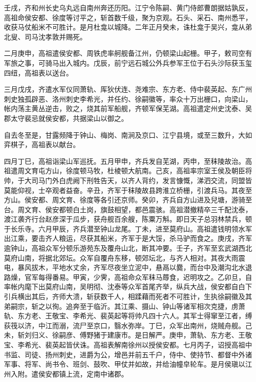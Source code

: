 \documentclass[]{article}
\begin{document}
壬戌，齐和州长史乌丸远自南州奔还历阳。江宁令陈嗣、黄门侍郎曹朗据姑孰反，高祖命侯安都、徐度等讨平之，斩首数千级，聚为京观。石头、采石、南州悉平，收获马仗船米不可胜计。是月杜龛以城降。二年正月癸未，诛杜龛于吴兴，龛从弟北叟、司马沈孝敦并赐死。

二月庚申，高祖遣侯安都、周铁虎率舸舰备江州，仍顿梁山起栅。甲子，敕司空有军旅之事，可骑马出入城内。戊辰，前宁远石城公外兵参军王位于石头沙际获玉玺四纽，高祖表以送台。

三月戊戌，齐遣水军仪同萧轨、厍狄伏连、尧难宗、东方老、侍中裴英起、东广州刺史独孤辟恶、洛州刺史李希光，并任约、徐嗣徽等，率众十万出栅口，向梁山，帐内荡主黄丛逆击，败之，烧其前军船舰，齐顿军保芜湖。高祖遣定州史沈泰、吴郡太守裴忌就侯安都，共据梁山以御之。

自去冬至是，甘露频降于钟山、梅岗、南涧及京口、江宁县境，或至三数升，大如弈棋子，高祖表以献台。

四月丁巳，高祖诣梁山军巡抚。五月甲申，齐兵发自芜湖，丙申，至秣陵故治。高祖遣周文育屯方山，徐度顿马牧，杜棱顿大航南。己亥，高祖率宗室王侯及朝臣将帅，于大司马门外白虎阙下刑牲告天，以齐人背约，发言慷慨，涕泗交流，同盟皆莫能仰视，士卒观者益奋。辛丑，齐军于秣陵故县跨淮立桥栅，引渡兵马。其夜至方山。侯安都、周文育、徐度等各引还京师。癸卯，齐兵自方山进及兒塘，游骑至台。周文育、侯安都顿白土岗，旗鼓相望，都邑震骇。高祖潜撤精卒三千配沈泰，渡江袭齐行台赵彦深于瓜步，获舟舰百余艘，陈粟万斛。即日天子总羽林禁兵，顿于长乐寺。六月甲辰，齐兵潜至钟山龙尾。丁未，进至莫府山。高祖遣钱明领水军出江乘，要击齐人粮运，尽获其船米，齐军于是大馁，杀马驴而食之。庚戌，齐军逾钟山，高祖众军分顿乐游苑东及覆舟山北，断其冲要。壬子，齐军至玄武湖西北莫府山南，将据北郊坛。众军自覆舟东移，顿郊坛北，与齐人相对。其夜大雨震电，暴风拔木，平地水丈余，齐军尽夜坐立泥中，悬鬲以爨，而台中及潮沟北水退路燥，官军每得番易。甲寅，少霁，高祖命众军秣马蓐食，迟明攻之。乙卯旦，自率帐内麾下出莫府山南，吴明彻、沈泰等众军首尾齐举，纵兵大战，侯安都自白下引兵横出其后，齐师大溃，斩获数千人，相蹂藉而死者不可胜计，生执徐嗣徽及其弟嗣宗，斩之以徇。追奔至于临沂。其江乘、摄山、钟山等诸军相次克捷，虏萧轨、东方老、王敬宝、李希光、裴英起等将帅凡四十六人。其军士得窜至江者，缚荻筏以济，中江而溺，流尸至京口，翳水弥岸。丁巳，众军出南州，烧贼舟舰。己未，斩刘归义、徐嗣彦、傅野猪于建康市。是日解严。庚申，萧轨、东方老、王敬宝、李希光、裴英起皆伏诛。高祖表解南徐州以授侯安都。七月丙子，诏授高祖中书监、司徒、扬州刺史，进爵为公，增邑并前五千户，侍中、使持节、都督中外诸军事、将军、尚书令、班剑、鼓吹、甲仗并如故，并给油幢皁轮车。是月侯瑱以江州入附。遣侯安都镇上流，定南中诸郡。
\end{document}
